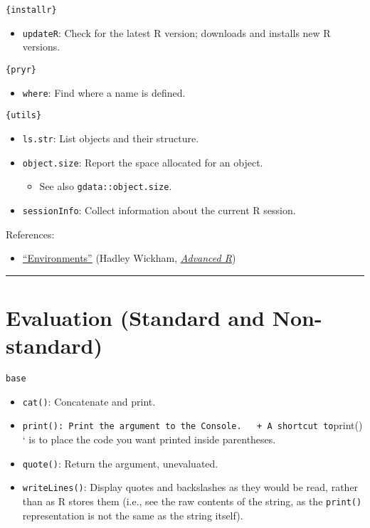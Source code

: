 \documentclass[]{book}
\providecommand{\tightlist}{%
  \setlength{\itemsep}{0pt}\setlength{\parskip}{0pt}}
\begin{document}
\texttt{\{installr\}}

\begin{itemize}
\tightlist
\item
  \texttt{updateR}: Check for the latest R version; downloads and installs new R versions.
\end{itemize}

\texttt{\{pryr\}}

\begin{itemize}
\tightlist
\item
  \texttt{where}: Find where a name is defined.
\end{itemize}

\texttt{\{utils\}}

\begin{itemize}
\tightlist
\item
  \texttt{ls.str}: List objects and their structure.
\item
  \texttt{object.size}: Report the space allocated for an object.

  \begin{itemize}
  \tightlist
  \item
    See also \texttt{gdata::object.size}.
  \end{itemize}
\item
  \texttt{sessionInfo}: Collect information about the current R session.
\end{itemize}

References:

\begin{itemize}
\tightlist
\item
  \href{http://adv-r.had.co.nz/Environments.html\#environments}{``Environments''} (Hadley Wickham, \href{http://adv-r.had.co.nz/}{\emph{Advanced R}})
\end{itemize}

\begin{center}\rule{0.5\linewidth}{\linethickness}\end{center}

\hypertarget{evaluation-standard-and-non-standard}{%
\section{Evaluation (Standard and Non-standard)}\label{evaluation-standard-and-non-standard}}

\texttt{base}

\begin{itemize}
\tightlist
\item
  \texttt{cat()}: Concatenate and print.
\item
  \texttt{print():\ Print\ the\ argument\ to\ the\ Console.\ \ \ +\ A\ shortcut\ to}print()` is to place the code you want printed inside parentheses.
\item
  \texttt{quote()}: Return the argument, unevaluated.
\item
  \texttt{writeLines()}: Display quotes and backslashes as they would be read, rather than as R stores them (i.e., see the raw contents of the string, as the \texttt{print()} representation is not the same as the string itself).
\end{itemize}
\end{document}
